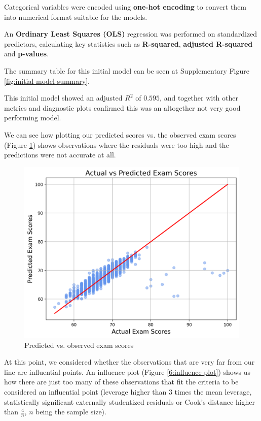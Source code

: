 \documentclass[twocolumn]{article} %
\begin{document}
Categorical variables were encoded using \textbf{one-hot encoding} to convert them into numerical format suitable for the models.

An \textbf{Ordinary Least Squares (OLS)} regression was performed on standardized predictors, calculating key statistics such as \textbf{R-squared}, \textbf{adjusted R-squared} and \textbf{p-values}.

The summary table for this initial model can be seen at Supplementary Figure \ref{fig:initial-model-summary}.

This initial model showed an adjusted $R^2$ of $0.595$, and together with other metrics and diagnostic plots confirmed this was an altogether not very good performing model.

We can see how plotting our predicted scores vs. the observed exam scores (Figure \ref{5:actual-vs-predicted}) shows observations where the residuals were too high and the predictions were not accurate at all.

\begin{figure}[h]
  \centering
  \includegraphics[width=\columnwidth]{5-actual-vs-predicted-scores.png}
  \caption{Predicted vs. observed exam scores}
  \label{5:actual-vs-predicted}
\end{figure}

At this point, we considered whether the observations that are very far from our line are influential points. An influence plot (Figure \ref{6:influence-plot}) shows us how there are just too many of these observations that fit the criteria to be considered an influential point (leverage higher than 3 times the mean leverage, statistically significant externally studentized residuals or Cook's distance higher than $\frac{4}{n}$, $n$ being the sample size).
\end{document}
